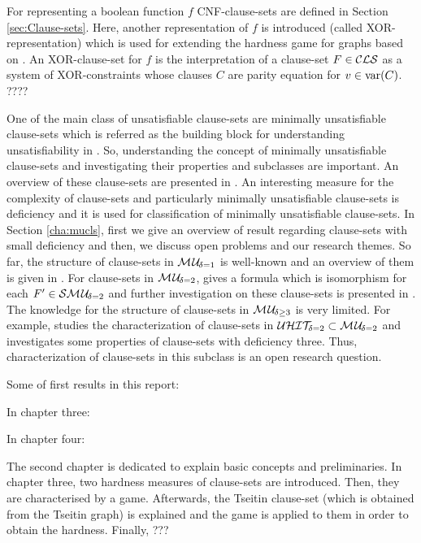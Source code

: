 \documentclass{report}
\begin{document}
For representing a boolean function $f$ CNF-clause-sets are defined in Section \ref{sec:Clause-sets}. Here, another representation of $f$ is introduced (called XOR-representation) which is used for extending the hardness game for graphs based on \cite{GwynneKullmann2013GoodRepresentationsIIex,GwynneKullmann2013GoodRepresentationsIILata}. An XOR-clause-set for $f$ is the interpretation of a clause-set $F \in \mathcal{CLS}$ as a system of XOR-constraints whose clauses $C$ are parity equation for $v \in \operatorname{var}(C)$. 
????


One of the main class of unsatisfiable clause-sets are minimally unsatisfiable clause-sets which is referred as the building block for understanding unsatisfiability in \cite{KullmannZhao2010Extremal}. So, understanding the concept of minimally unsatisfiable clause-sets and investigating their properties and subclasses are important. An overview of these clause-sets are presented in \cite{KullmannZhao2010Extremal, Kullmann2007HandbuchMU,KullmannZhao2012ConfluenceJ}. An interesting measure for the complexity of clause-sets and particularly minimally unsatisfiable clause-sets is deficiency and it is used for classification of minimally unsatisfiable clause-sets. In Section \ref{cha:mucls}, first we give an overview of result regarding clause-sets with small deficiency and then, we discuss open problems and our research themes. So far, the structure of clause-sets in $\mathcal{M\hspace{0.8pt}U}_{\!\delta=1}$ is well-known and an overview of them is given in \cite{KullmannZhao2010Extremal, Ku99dK,KleineBuening2000SubclassesMU,DDK98}. For clause-sets in $\mathcal{M\hspace{0.8pt}U}_{\!\delta=2}$, \cite{KleineBuening2000SubclassesMU} gives a formula which is isomorphism for each $F' \in \mathcal{S}\mathcal{M\hspace{0.8pt}U}_{\!\delta=2}$ and further investigation on these clause-sets is presented in \cite{KullmannZhao2010Extremal, KleineBuening2000SubclassesMU, KullmannZhao2012ConfluenceJ}. The knowledge for the structure of clause-sets in $\mathcal{M\hspace{0.8pt}U}_{\!\delta \ge 3}$ is very limited. For example, \cite{KullmannZhao2016UHitSAT} studies the characterization of clause-sets in $\mathcal{U}\mathcal{HIT}_{\!\!\delta=2} \subset \mathcal{M\hspace{0.8pt}U}_{\!\delta=2}$ and \cite{KullmannZhao2010Extremal} investigates some properties of clause-sets with deficiency three. Thus, characterization of clause-sets in this subclass is an open research question.

Some of first results in this report:

In chapter three:

In chapter four: 

The second chapter is dedicated to explain basic concepts and preliminaries. In chapter three, two hardness measures of clause-sets are introduced. Then, they are characterised by a game. Afterwards, the Tseitin clause-set (which is obtained from the Tseitin graph) is explained and the game is applied to them in order to obtain the hardness. Finally, ???
\end{document}
